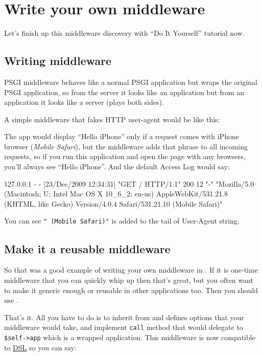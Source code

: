 \chapter{Write your own middleware}
\label{day-23-write-your-own-middleware}

Let's finish up this middleware discovery with ``Do It Yourself''
tutorial now.

\section{Writing middleware}\label{writing-middleware}

PSGI middleware behaves like a normal PSGI application but wraps the
original PSGI application, so from the server it looks like an
application but from an application it looks like a server (plays both
sides).

A simple middleware that fakes HTTP user-agent would be like this:


The app would display ``Hello iPhone'' only if a request comes with
iPhone browser (\emph{Mobile Safari}), but the middleware adds that
phrase to all incoming requests, so if you run this application and open
the page with any browsers, you'll always see ``Hello iPhone''. And the
default Access Log would say:

\begin{shell}
127.0.0.1 - - [23/Dec/2009 12:34:31] "GET / HTTP/1.1" 200 12 "-" "Mozilla/5.0 
(Macintosh; U; Intel Mac OS X 10_6_2; en-us) AppleWebKit/531.21.8 (KHTML, like
Gecko) Version/4.0.4 Safari/531.21.10 (Mobile Safari)"
\end{shell}

You can see \lstinline!" (Mobile Safari)"! is added to the tail of User-Agent
string.

\section{Make it a reusable middleware}\label{make-it-a-reusable-middleware}

So that was a good example of writing your own middleware in
. If it is one-time middleware that you can quickly
whip up then that's great, but you often want to make it generic enough
or reusable in other applications too. Then you should use
.


That's it. All you have to do is to inherit from  and
defines options that your middleware would take, and implement
\lstinline!call! method that would delegate to \lstinline!$self->app!
which is a wrapped application. This middleware is now compatible to
\href{http://advent.plackperl.org/2009/12/day-11-using-plackbuilder.html}{
DSL} so you can say:

